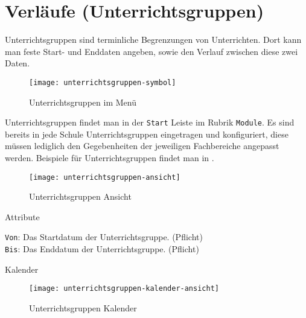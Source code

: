 \section{Verläufe (Unterrichtsgruppen)}
\label{sec:unterrichtsgruppen}

\noindent
Unterrichtsgruppen sind terminliche Begrenzungen von Unterrichten. Dort kann man feste Start- und Enddaten angeben, sowie den Verlauf zwischen diese zwei Daten.\\

\begin{wrapfigure}{r}{0.35\textwidth}
	\vspace{-14pt}
	\texttt{[image: unterrichtsgruppen-symbol]}
	\vspace{-5pt}
	\caption{Unterrichtsgruppen im Menü}
\end{wrapfigure}

\noindent
Unterrichtsgruppen findet man in der \texttt{Start} Leiste im Rubrik \texttt{Module}. Es sind bereits in jede Schule Unterrichtsgruppen eingetragen und konfiguriert, diese müssen lediglich den Gegebenheiten der jeweiligen Fachbereiche angepasst werden. Beispiele für Unterrichtsgruppen findet man in 
.\\

\begin{wrapfigure}{r}{0.35\textwidth}
	\label{fig:unterrichtsgruppen-symbol}
	\texttt{[image: unterrichtsgruppen-ansicht]}
	\vspace{-5pt}
	\caption{Unterrichtsgruppen Ansicht}
	\label{fig:unterrichtsgruppen-ansicht}
	\vspace{-115pt}
\end{wrapfigure}

\noindent
{\large Attribute\par}
\vspace{8pt}

\noindent
\texttt{Von}: Das Startdatum der Unterrichtsgruppe. (Pflicht)\\

\noindent
\texttt{Bis}: Das Enddatum der Unterrichtsgruppe. (Pflicht)\\

\vspace{54pt}

\noindent
{\large Kalender\par}
\vspace{8pt}

\begin{wrapfigure}{r}{0.35\textwidth}
	\vspace{-14pt}
	\texttt{[image: unterrichtsgruppen-kalender-ansicht]}
	\vspace{-5pt}
	\caption{Unterrichtsgruppen Kalender}
	\label{fig:unterrichtsgruppen-kalender-ansicht}
	\vspace{14pt}
\end{wrapfigure}

